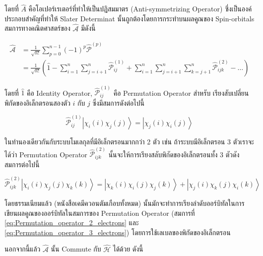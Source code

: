 \noindent โดยที่ $\hat{A}$ คือโอเปอร์เรเตอร์ที่ทำให้เป็นปฏิสมมาตร (Anti-symmetrizing Operator) ซึ่งเป็นองค์ประกอบสำคัญที่ทำให้%
Slater Determinat นั้นถูกต้องโดยการกระทำบนผลคูณของ Spin-orbitals สมการทางคณิตศาสตร์ของ $\hat{\mathscr{A}}$ มีดังนี้

\begin{equation}
    \label{eq:Antisymmetrizing_operator}
    \begin{aligned}
        \hat{\mathscr{A}} 
        & = \frac{1}{\sqrt{n !}} \sum_{p=0}^{n-1}(-1)^p \hat{\mathscr{P}}^{(p)} \\
        & = \frac{1}{\sqrt{n !}}\left(\hat{1}-\sum_{i=1}^n \sum_{j=i+1}^n \hat{\mathscr{P}}_{i j}^{(1)} 
            + \sum_{i=1}^n \sum_{j=i+1}^n \sum_{k=j+1}^n \hat{\mathscr{P}}_{i j k}^{(2)}-\ldots\right)
    \end{aligned}
\end{equation}

\noindent โดยที่ $\hat{1}$ คือ Identity Operator, $\hat{\mathscr{P}}_{i j}^{(1)}$ คือ Permutation Operator สำหรับ%
เรียงสับเปลี่ยนพิกัดของอิเล็กตรอนสองตัว $i$ กับ $j$ ซึ่งมีสมการดังต่อไปนี้

\begin{equation}
    \label{eq:Permutation_operator_2_electrons}
    \hat{\mathscr{P}}_{i j}^{(1)}\left|\chi_i(i) \chi_j(j)\right\rangle 
    = 
    \left|\chi_j(i) \chi_i(j)\right\rangle
\end{equation}

ในทำนองเดียวกันกับระบบโมเลกุลที่มีอิเล็กตรอนมากกว่า 2 ตัว เช่น ถ้าระบบมีอิเล็กตรอน 3 ตัวเราจะได้ว่า Permutation Operator 
$\hat{\mathcal{P}}_{i j k}^{(2)}$ นั้นจะให้การเรียงสลับพิกัดของอิเล็กตรอนทั้ง 3 ตัวดังสมการต่อไปนี้ 

\begin{equation}
    \label{eq:Permutation_operator_3_electrons}
    \hat{\mathscr{P}}_{i j k}^{(2)}\left|\chi_i(i) \chi_j(j) \chi_k(k)\right\rangle 
    = \left|\chi_k(i) \chi_i(j) \chi_j(k)\right\rangle+\left|\chi_j(i) \chi_k(j) \chi_i(k)\right\rangle
\end{equation}

โดยธรรมเนียมแล้ว (หนังสือเคมีควอนตัมเกือบทั้งหมด) นั้นมักจะทำการเรียงลำดับออร์บิทัลในการเขียนผลคูณของออร์บิทัลในสมการของ Permutation 
Operator (สมการที่ \ref{eq:Permutation_operator_2_electrons} และ \ref{eq:Permutation_operator_3_electrons}) 
โดยการใช้เลเบลของพิกัดของอิเล็กตรอน

นอกจากนี้แล้ว $\hat{\mathscr{A}}$ นั้น Commute กับ $\hat{\mathscr{H}}$ ได้ด้วย ดังนี้

